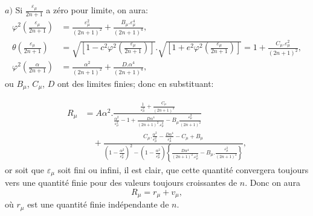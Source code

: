 \documentclass{article}
\begin{document}
$a)$ Si $\frac{\varepsilon_{\mu}}{2n+1}$ a zéro pour limite, on aura:
\[ \begin{aligned}
\varphi^{2}\left(\frac{\varepsilon_{\mu}}{2n+1}\right)&=\frac{\varepsilon_{\mu}^{2}}{(2n+1)^{2}}+\frac{B_{\mu}.\varepsilon_{\mu}^{4}}{(2n+1)^{4}},\\
\theta\left(\frac{\varepsilon_{\mu}}{2n+1}\right)&=\sqrt{\left[1-c^{2}\varphi^{2}\left(\frac{\varepsilon_{\mu}}{2n+1}\right)\right]}.\sqrt{\left[1+e^{2}\varphi^{2}\left(\frac{\varepsilon_{\mu}}{2n+1}\right)\right]}=1+\frac{C_{\mu}.\varepsilon_{\mu}^{2}}{(2n+1)^{2}},\\
\varphi^{2}\left(\frac{\alpha}{2n+1}\right)&=\frac{\alpha^{2}}{(2n+1)^{2}}+\frac{D.\alpha^{4}}{(2n+1)^{4}},
\end{aligned} \]
ou $B_{\mu}$, $C_{\mu}$, $D$ ont des limites finies; donc en substituant:

\[ \begin{aligned}
R_{\mu}&=A\alpha^{2}.\frac{\frac{1}{\varepsilon_{\mu}^{2}}+\frac{C_{\mu}}{(2n+1)^{2}}}{\frac{\alpha^{2}}{\varepsilon_{\mu}^{2}}-1+\frac{D\alpha^{4}}{(2n+1)^{2}.\varepsilon_{\mu}^{2}}-B_{\mu}\frac{\varepsilon_{\mu}^{2}}{(2n+1)^{2}}}\\
&\quad+\frac{C_{\mu}.\frac{\alpha^{2}}{\varepsilon_{\mu}^{2}}-\frac{D\alpha^{4}}{\varepsilon_{\mu}^{4}}-C_{\mu}+B_{\mu}}{\left(1-\frac{\alpha^{2}}{\varepsilon_{\mu}^{2}}\right)^{2}-\left(1-\frac{\alpha^{2}}{\varepsilon_{\mu}^{2}}\right)\left\{\frac{D\alpha^{4}}{(2n+1)^{2}.\varepsilon_{\mu}^{2}}-B_{\mu}.\frac{\varepsilon_{\mu}^{2}}{(2n+1)^{2}}\right\}},
\end{aligned} \tag{139.} \]
or soit que $\varepsilon_{\mu}$ soit fini ou infini, il est clair, que cette quantité convergera toujours vers une quantité finie pour des valeurs toujours croissantes de $n$. Donc on aura
\[ R_{\mu}=r_{\mu}+v_{\mu}, \tag{140.} \]
où $r_{\mu}$ est une quantité finie indépendante de $n$.
\end{document}
